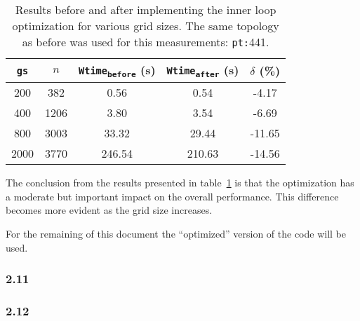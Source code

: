 \begin{table}[H] 
\centering
\begin{tabular}{*{5}{c}}
 \toprule
\texttt{gs}  &  $n$   &  \texttt{Wtime\textsubscript{before}} (\si{s})  &  \texttt{Wtime\textsubscript{after}} (\si{s})  & $\delta$ (\%) \\ \midrule
200          &   382  &  0.56                                           &  0.54                                          &  -4.17        \\
400          &  1206  &  3.80                                           &  3.54                                          &  -6.69        \\
800          &  3003  &  33.32                                          &  29.44                                         &  -11.65       \\
2000         &  3770  &  246.54                                         &  210.63                                        &  -14.56       \\
\bottomrule
\end{tabular}
\caption{Results before and after implementing the inner loop optimization for various grid sizes.
The same topology as before was used for this measurements: \texttt{pt:}441.}
\label{tbl:optimization}
\end{table}

The conclusion from the results presented in table~\ref{tbl:optimization} is that the optimization has a moderate but important impact on the overall performance. This difference becomes more evident as the grid size increases.

For the remaining of this document the ``optimized'' version of the code will be used.

\subsubsection{2.11}


\subsubsection{2.12}







